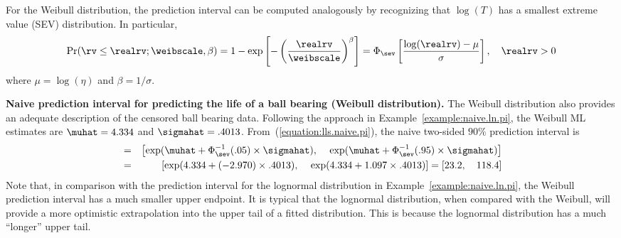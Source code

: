 For the Weibull distribution, the prediction interval can be computed
analogously by recognizing that $\log(T)$ has a smallest extreme
value (SEV) distribution. In particular,
\begin{displaymath}
\Pr(\rv \leq \realrv;\weibscale,\beta ) = 1-
\exp \left [-\left (\frac{\realrv}{\weibscale} \right )^{\beta}
\right ] =  \Phi_{\sev}\left [\frac{\log(\realrv)-\mu}{\sigma}
\right ],    \quad \realrv > 0
\end{displaymath}
where $\mu=\log(\eta)$ and $\beta=1/\sigma$.

\begin{example}
\label{example:naive.weibull.pi}
{\bf Naive prediction interval for predicting the life of a ball
bearing
(Weibull distribution).}
The Weibull distribution also provides an adequate description of
the censored ball bearing data.
Following the approach in Example~\ref{example:naive.ln.pi}, the
Weibull ML estimates are $\muhat=4.334$ and $\sigmahat=.4013$.
From~(\ref{equation:lls.naive.pi}), the naive two-sided $90\%$
prediction interval is
\begin{eqnarray}
          [ \Tlower, \quad \Tupper ] &=&
\label{equation:naive.weibull.pi}
\left [ \exp(\muhat + \Phi_{\sev}^{-1}(.05) \times \sigmahat), \, 
\quad\exp( \muhat + \Phi_{\sev}^{-1}(.95)  \times \sigmahat)
\right ] \\
 &=&
\left [ \exp(4.334 + (-2.970) \times .4013), \,
	\quad \exp(4.334 + 1.097 \times .4013)
	\right ] =  \left [23.2, \quad  118.4 \right] \nonumber
\end{eqnarray}
Note that, in comparison with the prediction interval for the
lognormal distribution in Example~\ref{example:naive.ln.pi}, the
Weibull prediction interval has a much smaller upper endpoint. It is
typical that the lognormal distribution, when compared with the
Weibull, will provide a more optimistic extrapolation into the upper
tail of a fitted distribution. This is because the lognormal
distribution has a much ``longer'' upper tail.
\end{example}

